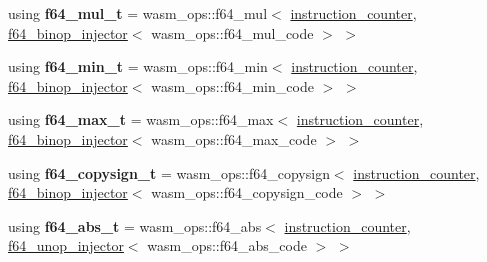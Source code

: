 \begin{DoxyCompactItemize}
using {\bfseries f64\+\_\+mul\+\_\+t} = wasm\+\_\+ops\+::f64\+\_\+mul$<$ \mbox{\hyperlink{structaacio_1_1chain_1_1wasm__injections_1_1instruction__counter}{instruction\+\_\+counter}}, \mbox{\hyperlink{structaacio_1_1chain_1_1wasm__injections_1_1f64__binop__injector}{f64\+\_\+binop\+\_\+injector}}$<$ wasm\+\_\+ops\+::f64\+\_\+mul\+\_\+code $>$ $>$
\item 
\mbox{\label{structaacio_1_1chain_1_1wasm__injections_1_1pre__op__injectors_a66f0be426d87ddd9f8589572b46ea155}} 
using {\bfseries f64\+\_\+min\+\_\+t} = wasm\+\_\+ops\+::f64\+\_\+min$<$ \mbox{\hyperlink{structaacio_1_1chain_1_1wasm__injections_1_1instruction__counter}{instruction\+\_\+counter}}, \mbox{\hyperlink{structaacio_1_1chain_1_1wasm__injections_1_1f64__binop__injector}{f64\+\_\+binop\+\_\+injector}}$<$ wasm\+\_\+ops\+::f64\+\_\+min\+\_\+code $>$ $>$
\item 
\mbox{\label{structaacio_1_1chain_1_1wasm__injections_1_1pre__op__injectors_aa95b266840fd120fe296b2a677641e65}} 
using {\bfseries f64\+\_\+max\+\_\+t} = wasm\+\_\+ops\+::f64\+\_\+max$<$ \mbox{\hyperlink{structaacio_1_1chain_1_1wasm__injections_1_1instruction__counter}{instruction\+\_\+counter}}, \mbox{\hyperlink{structaacio_1_1chain_1_1wasm__injections_1_1f64__binop__injector}{f64\+\_\+binop\+\_\+injector}}$<$ wasm\+\_\+ops\+::f64\+\_\+max\+\_\+code $>$ $>$
\item 
\mbox{\label{structaacio_1_1chain_1_1wasm__injections_1_1pre__op__injectors_ad89de8a98fa3b7376e92cf630ce9f253}} 
using {\bfseries f64\+\_\+copysign\+\_\+t} = wasm\+\_\+ops\+::f64\+\_\+copysign$<$ \mbox{\hyperlink{structaacio_1_1chain_1_1wasm__injections_1_1instruction__counter}{instruction\+\_\+counter}}, \mbox{\hyperlink{structaacio_1_1chain_1_1wasm__injections_1_1f64__binop__injector}{f64\+\_\+binop\+\_\+injector}}$<$ wasm\+\_\+ops\+::f64\+\_\+copysign\+\_\+code $>$ $>$
\item 
\mbox{\label{structaacio_1_1chain_1_1wasm__injections_1_1pre__op__injectors_a791aeef5ddfa349e16496a3890c04cb7}} 
using {\bfseries f64\+\_\+abs\+\_\+t} = wasm\+\_\+ops\+::f64\+\_\+abs$<$ \mbox{\hyperlink{structaacio_1_1chain_1_1wasm__injections_1_1instruction__counter}{instruction\+\_\+counter}}, \mbox{\hyperlink{structaacio_1_1chain_1_1wasm__injections_1_1f64__unop__injector}{f64\+\_\+unop\+\_\+injector}}$<$ wasm\+\_\+ops\+::f64\+\_\+abs\+\_\+code $>$ $>$

\end{DoxyCompactItemize}
